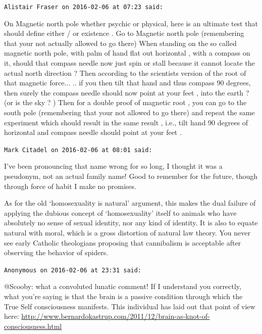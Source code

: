 \begin{footnotesize}
\begin{sffamily}
\hfill

\texttt{Alistair Fraser on 2016-02-06 at 07:23 said:}

On Magnetic north pole whether psychic or physical, here is an ultimate test that should define either / or existence . Go to Magnetic north pole (remembering that your not actually allowed to go there) When standing on the so called magnetic north pole, with palm of hand flat out horizontal , with a compass on it, should that compass needle now just spin or stall because it cannot locate the actual north direction ? Then according to the scientists version of the root of that magnetic force... .. if you then tilt that hand and thus compass 90 degrees, then surely the compass needle should now point at your feet , into the earth ? (or is the sky ? ) Then for a double proof of magnetic root , you can go to the south pole (remembering that your not allowed to go there) and repeat the same experiment which should result in the same result , i.e., tilt hand 90 degrees of horizontal and compass needle should point at your feet .

\hfill

\texttt{Mark Citadel on 2016-02-06 at 08:01 said:}

I've been pronouncing that name wrong for so long, I thought it was a pseudonym, not an actual family name! Good to remember for the future, though through force of habit I make no promises.

As for the old `homosexuality is natural' argument, this makes the dual failure of applying the dubious concept of `homosexuality' itself to animals who have absolutely no sense of sexual identity, nor any kind of identity. It is also to equate natural with moral, which is a gross distortion of natural law theory. You never see early Catholic theologians proposing that cannibalism is acceptable after observing the behavior of spiders.

\hfill

\texttt{Anonymous on 2016-02-06 at 23:31 said:}

@Scooby: what a convoluted lunatic comment! If I understand you correctly, what you're saying is that the brain is a passive condition through which the True Self consciousness manifests. This individual has laid out that point of view here:
\url{http://www.bernardokastrup.com/2011/12/brain-as-knot-of-consciousness.html}


\end{sffamily}
\end{footnotesize}

